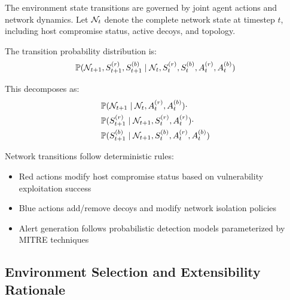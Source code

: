 \documentclass[12pt,oneside,a4paper]{article}
\theoremstyle{definition}
\theoremstyle{plain}
\begin{document}
The environment state transitions are governed by joint agent actions and network dynamics. Let $\mathcal{N}_t$ denote the complete network state at timestep $t$, including host compromise status, active decoys, and topology.

The transition probability distribution is:
\begin{equation}
\mathbb{P}(\mathcal{N}_{t+1}, S_{t+1}^{(r)}, S_{t+1}^{(b)} \mid \mathcal{N}_t, S_t^{(r)}, S_t^{(b)}, A_t^{(r)}, A_t^{(b)})
\end{equation}

This decomposes as:
\begin{align}
&\mathbb{P}(\mathcal{N}_{t+1} \mid \mathcal{N}_t, A_t^{(r)}, A_t^{(b)}) \cdot \\
&\mathbb{P}(S_{t+1}^{(r)} \mid \mathcal{N}_{t+1}, S_t^{(r)}, A_t^{(r)}) \cdot \\
&\mathbb{P}(S_{t+1}^{(b)} \mid \mathcal{N}_{t+1}, S_t^{(b)}, A_t^{(r)}, A_t^{(b)})
\end{align}

Network transitions follow deterministic rules:
\begin{itemize}
    \item Red actions modify host compromise status based on vulnerability exploitation success
    \item Blue actions add/remove decoys and modify network isolation policies
    \item Alert generation follows probabilistic detection models parameterized by MITRE techniques
\end{itemize}

\subsection{Environment Selection and Extensibility Rationale}
\end{document}
